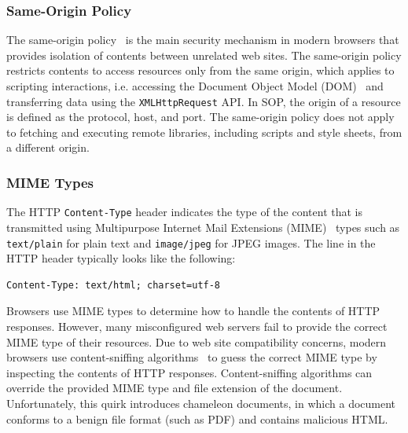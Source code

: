 \documentclass{acm_proc_article-sp}
\begin{document}
\subsubsection{Same-Origin Policy}
The same-origin policy~\cite{mozillasameorigin} is the main security mechanism in modern browsers that provides isolation of contents between unrelated web sites. The same-origin policy restricts contents to access resources only from the same origin, which applies to scripting interactions, i.e. accessing the Document Object Model (DOM)~\cite{dom} and transferring data using the \texttt{XMLHttpRequest} API. In SOP, the origin of a resource is defined as the protocol, host, and port. The same-origin policy does not apply to fetching and executing remote libraries, including scripts and style sheets, from a different origin.

\subsubsection{MIME Types}
The HTTP \texttt{Content-Type} header indicates the type of the content that is transmitted using Multipurpose Internet Mail Extensions (MIME)~\cite{mime} types such as \texttt{text/plain} for plain text and \texttt{image/jpeg} for JPEG images. The line in the HTTP header typically looks like the following:
\begin{verbatim}
Content-Type: text/html; charset=utf-8
\end{verbatim}
Browsers use MIME types to determine how to handle the contents of HTTP responses. However, many misconfigured web servers fail to provide the correct MIME type of their resources. Due to web site compatibility concerns, modern browsers use content-sniffing algorithms~\cite{securecontentsniffing} to guess the correct MIME type by inspecting the contents of HTTP responses.  Content-sniffing algorithms can override the provided MIME type and file extension of the document. Unfortunately, this quirk introduces chameleon documents, in which a document conforms to a benign file format (such as PDF) and contains malicious HTML.
\end{document}
